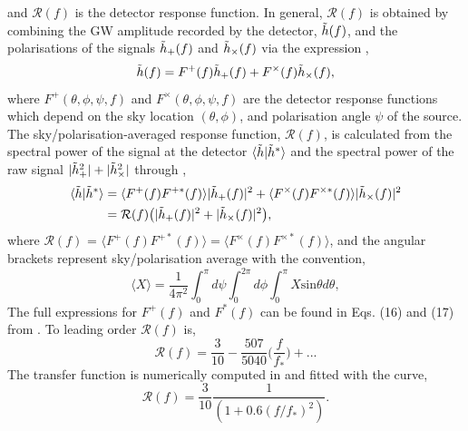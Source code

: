 \documentclass[a4paper,12pt]{article}
\begin{document}
and $\mathcal{R}(f)$ is the detector response function. In general, $\mathcal{R}(f)$ is obtained by combining the GW amplitude recorded by the detector, $\Tilde{h}(f)$, and the polarisations of the signals $\Tilde{h}_{+}(f)$ and $\Tilde{h}_{\times}(f)$ via the expression \cite{robson2019construction},
\begin{equation}
\Tilde{h}(f) = F^{+}(f) \Tilde{h}_{+}(f) + F^{\times}(f)\Tilde{h}_{\times}(f),
\label{eq:strain_plus_crossLISA}
\end{equation}
where $F^{+}(\theta,\phi, \psi,f)$ and $F^{\times}(\theta,\phi, \psi,f)$ are the detector response functions which depend on the sky location $(\theta,\phi)$, and polarisation angle $\psi$ of the source. The sky/polarisation-averaged response function, $\mathcal{R}(f)$, is calculated from the spectral power of the signal at the detector $\langle \Tilde{h} | \Tilde{h}^{\ast}\rangle$ and the spectral power of the raw signal $|\Tilde{h}^{2}_{+}| + |\Tilde{h}^{2}_{\times}|$ through \cite{robson2019construction},
\begin{subequations}
\begin{align}
\langle \Tilde{h} | \Tilde{h}^{\ast}\rangle &=  \langle F^{+}(f) F^{+ \ast}(f) \rangle |\Tilde{h}_{+}(f)|^{2} + \langle F^{\times}(f) F^{\times \ast}(f) \rangle |\Tilde{h}_{\times}(f)|^{2} \\
&= \mathcal{R}(f)\big(|\Tilde{h}_{+}(f)|^{2} + |\Tilde{h}_{\times}(f)|^{2} \big),
\label{eq:response_spectralpower}
\end{align}
\end{subequations}
where $\mathcal{R}(f)$ = $\langle F^{+}(f) F^{+ \ast}(f) \rangle = \langle F^{\times}(f) F^{\times \ast}(f) \rangle$, and the angular brackets represent sky/polarisation average with the convention,
\begin{equation}
\langle X \rangle = \frac{1}{4 \pi^{2}} \int^{\pi}_{0} d \psi \int^{2\pi}_{0} d \phi \int^{\pi}_{0} X \text{sin} \theta d\theta,
\label{eq:average}
\end{equation}
The full expressions for $F^{+}(f)$ and $F^{\ast}(f)$ can be found in Eqs. (16) and (17) from \cite{cornish2001detecting}. To leading order $\mathcal{R}(f)$ is,
\begin{equation}
\mathcal{R}(f) = \frac{3}{10} - \frac{507}{5040} \bigg( \frac{f}{f_{\ast}} \bigg) + ...
\label{eq:transferfunction}
\end{equation}
The transfer function is numerically computed in \cite{larson2000sensitivity} and fitted with the curve\cite{robson2019construction},
\begin{equation}
\mathcal{R}(f) = \frac{3}{10} \frac{1}{(1 + 0.6(f/f_{\ast})^{2})}.
\label{eq:transferfunction}
\end{equation}
\end{document}
